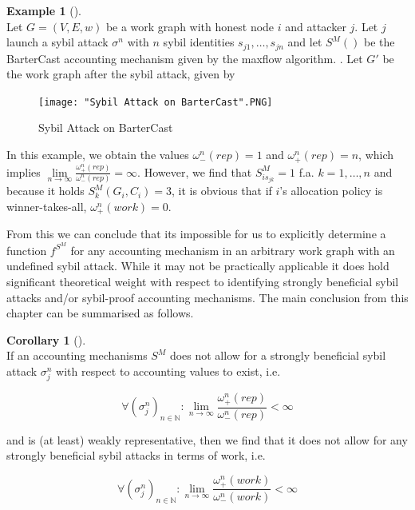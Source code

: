 \documentclass[11pt,a4paper]{report}
\theoremstyle{definition}
\theoremstyle{theorem}
\theoremstyle{proposition}
\theoremstyle{corollary}
\newtheorem{corollary}{Corollary}[section]
\theoremstyle{lemma}
\theoremstyle{example}
\newtheorem{example}{Example}[section]
\theoremstyle{remark}
\begin{document}
\begin{example}[]\ \\
Let $G=(V,E,w)$ be a work graph with honest node $i$ and attacker $j$. Let $j$ launch a sybil attack $\sigma^n$ with $n$ sybil identities $s_{j1},\ldots,s_{jn}$ and let $S^M()$ be the BarterCast accounting mechanism given by the maxflow algorithm. \cite{Bartercast: A Practical Approach to Prevent Lazy Freeriding in P2P Networks}. Let $G'$ be the work graph after the sybil attack, given by 

\begin{figure}[H]
\begin{center}
\texttt{[image: "Sybil Attack on BarterCast".PNG]}
\caption{Sybil Attack on BarterCast}
\label{fig:Sybil Attack on BarterCast}
\end{center}
\end{figure} 

\noindent{}In this example, we obtain the values $\omega_{-}^{n}(rep)=1$ and $\omega_{+}^{n}(rep)=n$, which implies $\lim\limits_{n\rightarrow\infty}\frac{\omega_{+}^{n}(rep)}{\omega_{-}^{n}(rep)}=\infty$. However, we find that $S^M_{is_{jk}}=1$ f.a. $k=1,\ldots,n$ and because it holds $S^M_k(G_i,C_i)=3$, it is obvious that if $i$'s allocation policy is winner-takes-all, $\omega^{n}_{+}(work)=0$.
\end{example}

\noindent{}From this we can conclude that its impossible for us to explicitly determine a function $f^{S^M}$ for any accounting mechanism in an arbitrary work graph with an undefined sybil attack. While it may not be practically applicable it does hold significant theoretical weight with respect to identifying strongly beneficial sybil attacks and/or sybil-proof accounting mechanisms. The main conclusion from this chapter can be summarised as follows. \vspace{1em}\\ 

\begin{corollary}[]\ \\
\noindent{}If an accounting mechanisms $S^M$ does not allow for a strongly beneficial sybil attack $\sigma_j^n$ with respect to accounting values to exist, i.e.

\[
\forall\left(\sigma_j^n\right)_{n\in\mathbb{N}}:\lim\limits_{n\rightarrow\infty}\frac{\omega^{n}_{+}(rep)}{\omega^{n}_{-}(rep)}<\infty
\]

\noindent{}and is (at least) weakly representative, then we find that it does not allow for any strongly beneficial sybil attacks in terms of work, i.e.

\[
\forall\left(\sigma_j^n\right)_{n\in\mathbb{N}}:\lim\limits_{n\rightarrow\infty}\frac{\omega^{n}_{+}(work)}{\omega^{n}_{-}(work)}<\infty
\]
\end{corollary}
 
\end{document}
